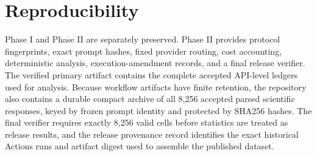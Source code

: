 \documentclass[11pt]{article}
\begin{document}
\section{Reproducibility}
Phase I and Phase II are separately preserved. Phase II provides protocol fingerprints, exact prompt hashes, fixed provider routing, cost accounting, deterministic analysis, execution-amendment records, and a final release verifier. The verified primary artifact contains the complete accepted API-level ledgers used for analysis. Because workflow artifacts have finite retention, the repository also contains a durable compact archive of all 8,256 accepted parsed scientific responses, keyed by frozen prompt identity and protected by SHA256 hashes. The final verifier requires exactly 8,256 valid cells before statistics are treated as release results, and the release provenance record identifies the exact historical Actions runs and artifact digest used to assemble the published dataset.



\end{document}
